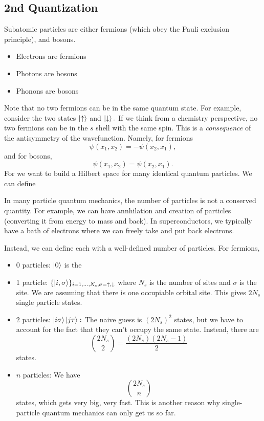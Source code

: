 \documentclass{article}
\numberwithin{equation}{section}
\begin{document}
\subsection{2nd Quantization}
Subatomic particles are either fermions (which obey the Pauli exclusion principle), and bosons.
\begin{itemize}
    \item Electrons are fermions
    \item Photons are bosons
    \item Phonons are bosons
\end{itemize}
Note that no two fermions can be in the same quantum state. For example, consider the two states $\ket{\uparrow}$ and $\ket{\downarrow}.$ If we think from a chemistry perspective, no two fermions can be in the $s$ shell with the same spin. This is a \textit{consequence} of the antisymmetry of the wavefunction. Namely, for fermions 
\begin{equation*}
    \psi(x_1,x_2) = -\psi(x_2,x_1),
\end{equation*}
and for bosons,
\begin{equation*}
    \psi(x_1,x_2) = \psi(x_2,x_1).
\end{equation*}
For  we want to build a Hilbert space for many identical quantum particles. We can define 
\begin{idea}
    In many particle quantum mechanics, the number of particles is not a conserved quantity. For example, we can have annhilation and creation of particles (converting it from energy to mass and back). In superconductors, we typically have a bath of electrons where we can freely take and put back electrons.
\end{idea}
Instead, we can define  each with a well-defined number of particles. For fermions,
\begin{itemize}
    \item 0 particles: $\ket{0}$ is the 
    \item 1 particle: $\{\ket{i,\sigma}\}_{i=1,\dots,N_s,\sigma=\uparrow,\downarrow}$ where $N_s$ is the number of sites and $\sigma$ is the site. We are assuming that there is one occupiable orbital site. This gives $2N_s$ single particle states.
    \item 2 particles: $\ket{i\sigma}\ket{j\tau}:$ The naive guess is $(2N_s)^2$ states, but we have to account for the fact that they can't occupy the same state. Instead, there are 
    \begin{equation*}
        \binom{2N_s}{2} = \frac{(2N_s)(2N_s-1)}{2} 
    \end{equation*}
    states.
    \item $n$ particles: We have 
    \begin{equation*}
        \binom{2N_s}{n}
    \end{equation*}
    states, which gets very big, very fast. This is another reason why single-particle quantum mechanics can only get us so far.
\end{itemize}
\end{document}
